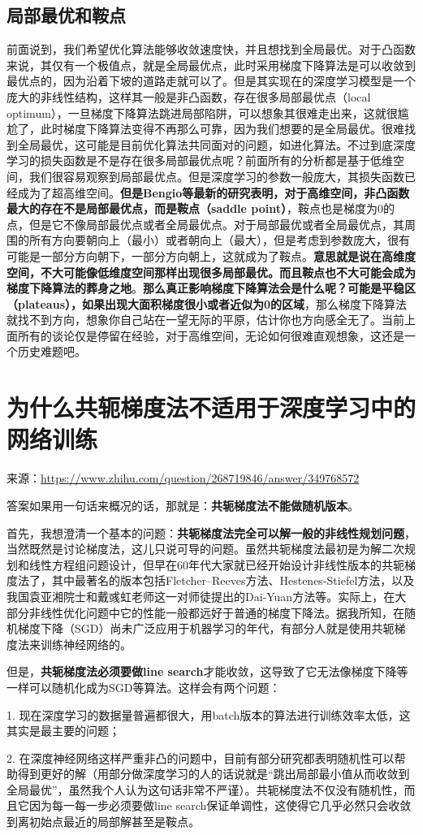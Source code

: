 \documentclass[12pt]{article}
\begin{document}
\subsection{局部最优和鞍点}
前面说到，我们希望优化算法能够收敛速度快，并且想找到全局最优。对于凸函数来说，其仅有一个极值点，就是全局最优点，此时采用梯度下降算法是可以收敛到最优点的，因为沿着下坡的道路走就可以了。但是其实现在的深度学习模型是一个庞大的非线性结构，这样其一般是非凸函数，存在很多局部最优点（local optimum），一旦梯度下降算法跳进局部陷阱，可以想象其很难走出来，这就很尴尬了，此时梯度下降算法变得不再那么可靠，因为我们想要的是全局最优。很难找到全局最优，这可能是目前优化算法共同面对的问题，如进化算法。不过到底深度学习的损失函数是不是存在很多局部最优点呢？前面所有的分析都是基于低维空间，我们很容易观察到局部最优点。但是深度学习的参数一般庞大，其损失函数已经成为了超高维空间。\textbf{但是Bengio等最新的研究表明，对于高维空间，非凸函数最大的存在不是局部最优点，而是鞍点（saddle point）}，鞍点也是梯度为0的点，但是它不像局部最优点或者全局最优点。对于局部最优或者全局最优点，其周围的所有方向要朝向上（最小）或者朝向上（最大），但是考虑到参数庞大，很有可能是一部分方向朝下，一部分方向朝上，这就成为了鞍点。\textbf{意思就是说在高维度空间，不大可能像低维度空间那样出现很多局部最优。而且鞍点也不大可能会成为梯度下降算法的葬身之地}。\textbf{那么真正影响梯度下降算法会是什么呢？可能是平稳区（plateaus），如果出现大面积梯度很小或者近似为0的区域}，那么梯度下降算法就找不到方向，想象你自己站在一望无际的平原，估计你也方向感全无了。当前上面所有的谈论仅是停留在经验，对于高维空间，无论如何很难直观想象，这还是一个历史难题吧。

\section{为什么共轭梯度法不适用于深度学习中的网络训练}
来源：\url{https://www.zhihu.com/question/268719846/answer/349768572}

答案如果用一句话来概况的话，那就是：\textbf{共轭梯度法不能做随机版本}。

首先，我想澄清一个基本的问题：\textbf{共轭梯度法完全可以解一般的非线性规划问题}，当然既然是讨论梯度法，这儿只说可导的问题。虽然共轭梯度法最初是为解二次规划和线性方程组问题设计，但早在60年代大家就已经开始设计非线性版本的共轭梯度法了，其中最著名的版本包括Fletcher–Reeves方法、Hestenes-Stiefel方法，以及我国袁亚湘院士和戴彧虹老师这一对师徒提出的Dai-Yuan方法等。实际上，在大部分非线性优化问题中它的性能一般都远好于普通的梯度下降法。据我所知，在随机梯度下降（SGD）尚未广泛应用于机器学习的年代，有部分人就是使用共轭梯度法来训练神经网络的。

但是，\textbf{共轭梯度法必须要做line search}才能收敛，这导致了它无法像梯度下降等一样可以随机化成为SGD等算法。这样会有两个问题：

1. 现在深度学习的数据量普遍都很大，用batch版本的算法进行训练效率太低，这其实是最主要的问题；

2. 在深度神经网络这样严重非凸的问题中，目前有部分研究都表明随机性可以帮助得到更好的解（用部分做深度学习的人的话说就是“跳出局部最小值从而收敛到全局最优”，虽然我个人认为这句话非常不严谨）。共轭梯度法不仅没有随机性，而且它因为每一每一步必须要做line search保证单调性，这使得它几乎必然只会收敛到离初始点最近的局部解甚至是鞍点。



\end{document}
